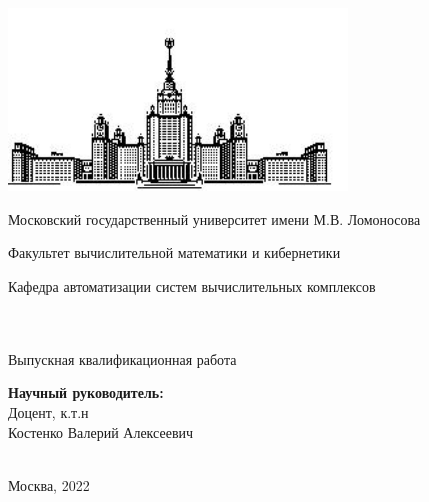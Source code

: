 \makeatletter
\begin{titlepage}
    \begin{center}
        \includegraphics[width=9cm]{imgs/msulogo.png}\\
        \small
        \centerline{Московский государственный университет имени М.В. Ломоносова}
        \centerline{Факультет вычислительной математики и кибернетики}
        \centerline{Кафедра автоматизации систем вычислительных комплексов}
        \centerline{}
        \Large
        \vfill
        {\@author}\\
        \null
        {\LARGE \bf
        \@title
        }\\
        \null \null
        {\large Выпускная квалификационная работа}\\
        \null \null
    \end{center}
    \begin{flushright}
        {\bf Научный руководитель:}\\
        Доцент, к.т.н \\Костенко Валерий Алексеевич\\
        ~\\
        \vfill
    \end{flushright}
    \centerline{Москва, 2022}
\end{titlepage}
\setcounter{page}{2}
